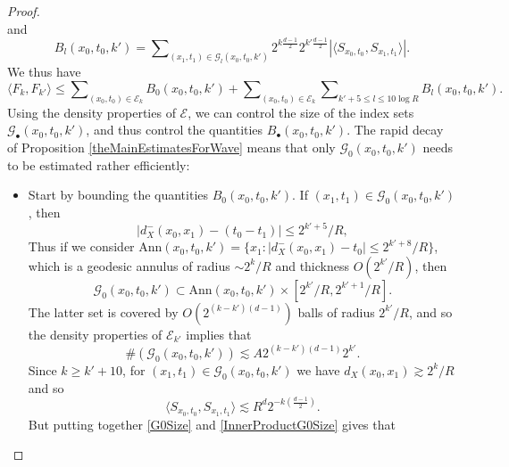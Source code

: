 \begin{proof}
\begin{equation}
\end{equation}
%
and
%
\begin{equation}
    B_l(x_0,t_0,k') = \sum\nolimits_{(x_1,t_1) \in \mathcal{G}_l(x_0,t_0,k')} 2^{k \frac{d-1}{2}} 2^{k' \frac{d-1}{2}} |\langle {S\!}_{x_0,t_0}, {S\!}_{x_1,t_1} \rangle|.
\end{equation}
%
We thus have
%
\begin{equation}
    \langle F_k, F_{k'} \rangle \leq \sum\nolimits_{(x_0,t_0) \in \mathcal{E}_k} B_0(x_0,t_0,k') + \sum\nolimits_{(x_0,t_0) \in \mathcal{E}_k} \sum\nolimits_{k' + 5 \leq l \leq 10 \log R} B_l(x_0,t_0,k').
\end{equation}
%
Using the density properties of $\mathcal{E}$, we can control the size of the index sets $\mathcal{G}_{\bullet}(x_0,t_0,k')$, and thus control the quantities $B_\bullet(x_0,t_0,k')$. The rapid decay of Proposition \ref{theMainEstimatesForWave} means that only $\mathcal{G}_0(x_0,t_0,k')$ needs to be estimated rather efficiently:
%
\begin{itemize}%
    \item Start by bounding the quantities $B_0(x_0,t_0,k')$. If $(x_1,t_1) \in \mathcal{G}_0(x_0,t_0,k')$, then
    \begin{equation}
        |d_X^-(x_0,x_1) - (t_0 - t_1)| \leq 2^{k'+5}/R,
    \end{equation}
    Thus if we consider $\text{Ann}(x_0,t_0,k') = \{ x_1: |d_X^-(x_0,x_1) - t_0| \leq 2^{k'+8}/R \}$, which is a geodesic annulus of radius $\sim 2^k / R$ and thickness $O(2^{k'}/R)$, then
    \begin{equation}
        \mathcal{G}_0(x_0,t_0,k') \subset \text{Ann}(x_0,t_0,k') \times [ 2^{k'}/R, 2^{k'+1}/R ].
    \end{equation}
    The latter set is covered by $O(2^{(k-k')(d-1)})$ balls of radius $2^{k'}/R$, and so the density properties of $\mathcal{E}_{k'}$ implies that
    \begin{equation} \label{G0Size}
        \#( \mathcal{G}_0(x_0,t_0,k') ) \lesssim A 2^{(k-k')(d-1)} 2^{k'}. 
    \end{equation}
    Since $k \geq k' + 10$, for $(x_1,t_1) \in \mathcal{G}_0(x_0,t_0,k')$ we have $d_X(x_0,x_1) \gtrsim 2^k / R$ and so
    \begin{equation} \label{InnerProductG0Size}
        \langle S_{x_0,t_0}, S_{x_1,t_1} \rangle \lesssim R^d 2^{-k \left( \frac{d-1}{2} \right)}.
    \end{equation}
    But putting together \eqref{G0Size} and \eqref{InnerProductG0Size} gives that

\end{itemize}
\end{proof}
